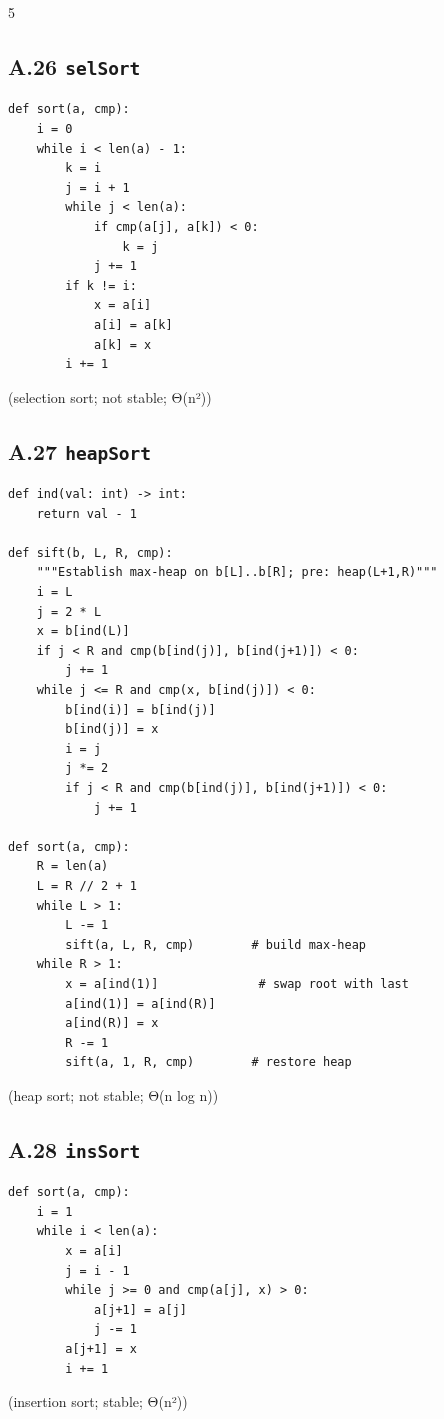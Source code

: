 \documentclass[6pt,landscape]{article}
\begin{document}
\begin{multicols}{5}

\subsection{A.26 \texttt{selSort}}\label{code:A26}
\begin{verbatim}
def sort(a, cmp):
    i = 0
    while i < len(a) - 1:
        k = i
        j = i + 1
        while j < len(a):
            if cmp(a[j], a[k]) < 0:
                k = j
            j += 1
        if k != i:
            x = a[i]
            a[i] = a[k]
            a[k] = x
        i += 1
\end{verbatim}
(selection sort; not stable; Θ(n²))

\subsection{A.27 \texttt{heapSort}}\label{code:A27}
\begin{verbatim}
def ind(val: int) -> int:
    return val - 1

def sift(b, L, R, cmp):
    """Establish max-heap on b[L]..b[R]; pre: heap(L+1,R)"""
    i = L
    j = 2 * L
    x = b[ind(L)]
    if j < R and cmp(b[ind(j)], b[ind(j+1)]) < 0:
        j += 1
    while j <= R and cmp(x, b[ind(j)]) < 0:
        b[ind(i)] = b[ind(j)]
        b[ind(j)] = x
        i = j
        j *= 2
        if j < R and cmp(b[ind(j)], b[ind(j+1)]) < 0:
            j += 1

def sort(a, cmp):
    R = len(a)
    L = R // 2 + 1
    while L > 1:
        L -= 1
        sift(a, L, R, cmp)        # build max-heap
    while R > 1:
        x = a[ind(1)]              # swap root with last
        a[ind(1)] = a[ind(R)]
        a[ind(R)] = x
        R -= 1
        sift(a, 1, R, cmp)        # restore heap
\end{verbatim}
(heap sort; not stable; Θ(n log n))

\subsection{A.28 \texttt{insSort}}\label{code:A28}
\begin{verbatim}
def sort(a, cmp):
    i = 1
    while i < len(a):
        x = a[i]
        j = i - 1
        while j >= 0 and cmp(a[j], x) > 0:
            a[j+1] = a[j]
            j -= 1
        a[j+1] = x
        i += 1
\end{verbatim}
(insertion sort; stable; Θ(n²))


\end{multicols}
\end{document}
